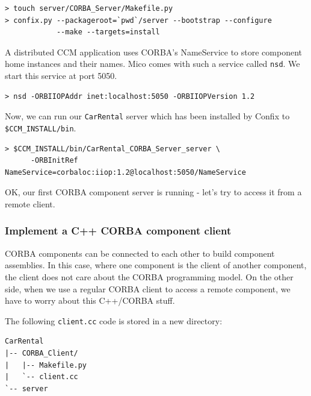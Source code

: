 \begin{small}
\begin{verbatim}
> touch server/CORBA_Server/Makefile.py
> confix.py --packageroot=`pwd`/server --bootstrap --configure 
            --make --targets=install
\end{verbatim}
\end{small}

A distributed CCM application uses CORBA's NameService to store component
home instances and their names. Mico comes with such a service called {\tt nsd}.
We start this service at port 5050.
\begin{small}
\begin{verbatim}
> nsd -ORBIIOPAddr inet:localhost:5050 -ORBIIOPVersion 1.2
\end{verbatim}
\end{small}

Now, we can run our {\tt CarRental} server which has been installed by Confix to
{\tt \$CCM\_INSTALL/bin}.
\begin{small}
\begin{verbatim}
> $CCM_INSTALL/bin/CarRental_CORBA_Server_server \
      -ORBInitRef NameService=corbaloc:iiop:1.2@localhost:5050/NameService
\end{verbatim}
\end{small}

OK, our first CORBA component server is running - let's try to access it from
a remote client.


\newpage
\subsubsection{Implement a C++ CORBA component client}

CORBA components can be connected to each other to build component assemblies.
In this case, where one component is the client of another component, the
client does not care about the CORBA programming model.
On the other side, when we use a regular CORBA client to access a remote
component, we have to worry about this C++/CORBA stuff.

The following {\tt client.cc} code is stored in a new directory:
\begin{small}
\begin{verbatim}
CarRental
|-- CORBA_Client/
|   |-- Makefile.py
|   `-- client.cc
`-- server
\end{verbatim}
\end{small}


